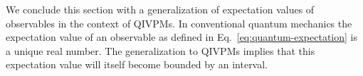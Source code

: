 \documentclass[english,reprint, aps, prl,superscriptaddress, showpacs,
showkeys, longbibliography, amsmath, amssymb, floatfix]{revtex4-1}
\theoremstyle{plain}
\theoremstyle{definition}
\newcommand{\Hilb}{\mathcal{H}}
\newcommand{\events}{\ensuremath{\mathcal{E}}}
\newcommand{\imposs}{\textbf{\textsf{F}}}
\newcommand{\necess}{\textbf{\textsf{T}}}
\newcommand{\unknown}{\textbf{\textsf{U}}}
\newcommand{\proj}[1]{\op{#1}{#1}}
\newcommand{\coreBorn}{\ensuremath{\overline{\Hilb}}}
\begin{document}

We conclude this section with a generalization of expectation values
of observables in the context of QIVPMs. In conventional quantum
mechanics the expectation value of an observable as defined in
Eq.~\eqref{eq:quantum-expectation} is a unique real number. The
generalization to QIVPMs implies that this expectation value will
itself become bounded by an interval. 
\end{document}
